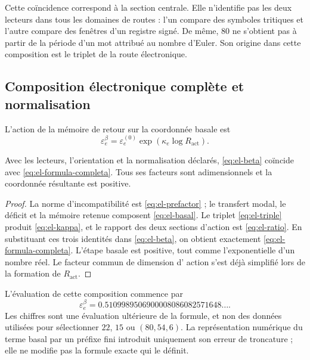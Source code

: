 Cette coïncidence correspond à la section centrale. Elle n'identifie pas les deux lecteurs dans tous les domaines de routes : l'un compare des symboles tritiques et l'autre compare des fenêtres d'un registre signé. De même, \(80\) ne s'obtient pas à partir de la période d'un mot attribué au nombre d'Euler. Son origine dans cette composition est le triplet de la route électronique.

\subsection{Composition électronique complète et normalisation}

\begin{definition}
L'action de la mémoire de retour sur la coordonnée basale est
\begin{equation}
 \varepsilon_e^\beta
 =\varepsilon_e^{(0)}\exp\!\left(\kappa_e\log R_{\mathrm{act}}\right).
 \label{eq:el-beta}
\end{equation}
\end{definition}

\begin{theorem}
Avec les lecteurs, l'orientation et la normalisation déclarés,
\eqref{eq:el-beta} coïncide avec \eqref{eq:el-formula-completa}. Tous
ses facteurs sont adimensionnels et la coordonnée résultante est positive.
\end{theorem}
\begin{proof}
La norme d'incompatibilité est \eqref{eq:el-prefactor} ; le transfert modal,
le déficit et la mémoire retenue composent \eqref{eq:el-basal}. Le
triplet \eqref{eq:el-triple} produit \eqref{eq:el-kappa}, et le rapport des
deux sections d'action est \eqref{eq:el-ratio}. En substituant ces
trois identités dans \eqref{eq:el-beta}, on obtient exactement
\eqref{eq:el-formula-completa}. L'étape basale est positive, tout comme
l'exponentielle d'un nombre réel. Le facteur commun de dimension d'
action s'est déjà simplifié lors de la formation de \(R_{\mathrm{act}}\).
\end{proof}

L'évaluation de cette composition commence par
\begin{equation}
 \varepsilon_e^\beta
 =0.5109989506900008086082571648\ldots.
 \label{eq:el-beta-decimal}
\end{equation}
Les chiffres sont une évaluation ultérieure de la formule, et non des données utilisées
pour sélectionner \(22\), \(15\) ou \((80,54,6)\). La représentation
numérique du terme basal par un préfixe fini introduit uniquement son
erreur de troncature ; elle ne modifie pas la formule exacte qui le définit.

